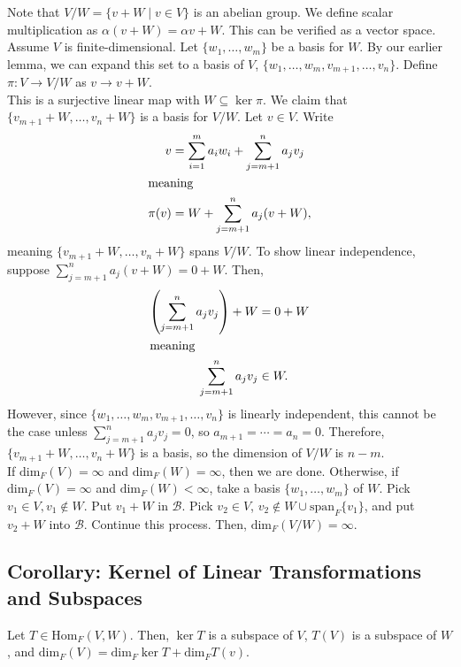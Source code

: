 \documentclass[8pt]{extarticle}
\begin{document}
  Note that $V/W = \{v+W\mid v\in V\}$ is an abelian group. We define scalar multiplication as $\alpha(v+W) = \alpha v + W$. This can be verified as a vector space.\\

  Assume $V$ is finite-dimensional. Let $\{w_1,\dots,w_m\}$ be a basis for $W$. By our earlier lemma, we can expand this set to a basis of $V$, $\{w_1,\dots,w_m,v_{m+1},\dots,v_n\}$. Define $\pi: V\rightarrow V/W$ as $v\rightarrow v+W$.\\

  This is a surjective linear map with $W\subseteq \ker\pi$. We claim that $\{v_{m+1}+W,\dots,v_{n}+W\}$ is a basis for $V/W$. Let $v\in V$. Write
  \begin{align*}
    v &= \sum_{i=1}^{m}a_iw_i + \sum_{j=m+1}^{n}a_jv_j\\
    \intertext{meaning}
    \pi(v) &= W + \sum_{j=m+1}^{n}a_j(v + W),
  \end{align*}
  meaning $\{v_{m+1}+W,\dots,v_{n}+ W\}$ spans $V/W$. To show linear independence, suppose $\sum_{j=m+1}^{n} a_j(v + W) = 0 + W$. Then,
  \begin{align*}
   \left(\sum_{j=m+1}^{n}a_jv_j\right) + W &= 0+W\\
   \intertext{meaning}
   \sum_{j=m+1}^{n}a_jv_j &\in W.
  \end{align*}
  However, since $\{w_1,\dots,w_m,v_{m+1},\dots,v_n\}$ is linearly independent, this cannot be the case unless $\sum_{j=m+1}^{n} a_jv_j = 0$, so $a_{m+1} = \cdots = a_n = 0$. Therefore, $\{v_{m+1}+W,\dots,v_{n}+W\}$ is a basis, so the dimension of $V/W$ is $n-m$.\\

  If $\text{dim}_{F}(V) = \infty$ and $\text{dim}_{F}(W) = \infty$, then we are done. Otherwise, if $\text{dim}_F(V) = \infty$ and $\text{dim}_F(W) < \infty$, take a basis $\{w_1,\dots,w_m\}$ of $W$. Pick $v_1\in V,v_1\notin W$. Put $v_1 + W$ in $\mathcal{B}$. Pick $v_{2}\in V$, $v_2\notin W\cup \text{span}_{F}\{v_1\}$, and put $v_2 + W$ into $\mathcal{B}$. Continue this process. Then, $\text{dim}_F(V/W) = \infty$.
  \subsection{Corollary: Kernel of Linear Transformations and Subspaces}%
  Let $T\in \text{Hom}_F(V,W)$. Then, $\ker T$ is a subspace of $V$, $T(V)$ is a subspace of $W$, and $\text{dim}_F(V) = \text{dim}_F\ker T + \text{dim}_F T(v)$.\\
\end{document}
